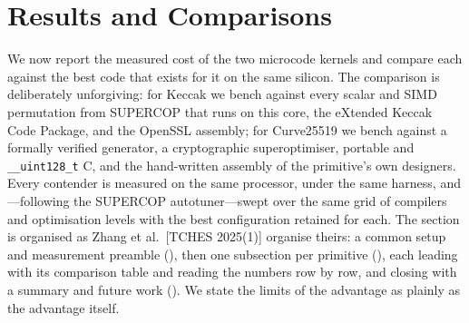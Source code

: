 %
%
%
%

\section{Results and Comparisons}
\label{sec:results}

We now report the measured cost of the two microcode kernels and compare each
against the best code that exists for it on the same silicon. The comparison is
deliberately unforgiving: for Keccak we bench against every scalar and SIMD
permutation from SUPERCOP that runs on this core, the eXtended Keccak Code
Package, and the OpenSSL assembly; for Curve25519 we bench against a formally
verified generator, a cryptographic superoptimiser, portable and
\texttt{\_\_uint128\_t} C, and the hand-written assembly of the primitive's own
designers. Every contender is measured on the same processor, under the same
harness, and---following the SUPERCOP autotuner---swept over the same grid of
compilers and optimisation levels with the best configuration retained for each.
The section is organised as Zhang et al.\ [TCHES 2025(1)] organise theirs: a
common setup and measurement preamble (), then one
subsection per primitive (), each
leading with its comparison table and reading the numbers row by row, and closing
with a summary and future work (). We state the limits of
the advantage as plainly as the advantage itself.

